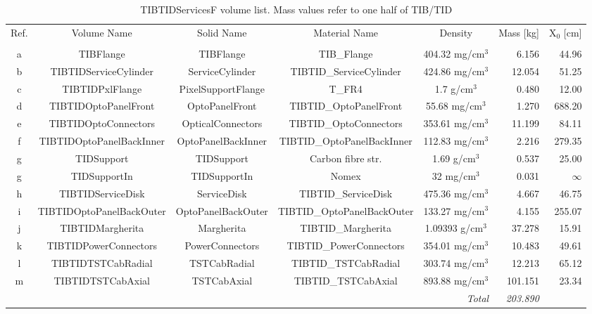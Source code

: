 \begin{table}
  \caption{\textsf {TIBTIDServicesF} volume list. Mass values refer to one half of TIB/TID}
  \label{tab:TIBTIDServicesF}
  \begin{center}
    \begin{tabular}{cccccrr}
      Ref.  & Volume Name  & Solid Name  & Material Name  & Density                  & Mass [kg] & X$_0$ [cm]     \\ 
      \\
 a & TIBFlange             &  TIBFlange        & TIB\_Flange             & 404.32 mg/cm$^3$  &       6.156  &  44.96 \\ 
 b & TIBTIDServiceCylinder & ServiceCylinder   & TIBTID\_ServiceCylinder & 424.86 mg/cm$^3$  &      12.054  &  51.25 \\ 
 c & TIBTIDPxlFlange       & PixelSupportFlange  & T\_FR4                & 1.7 g/cm$^3$      &       0.480  &  12.00 \\ 
 d & TIBTIDOptoPanelFront  & OptoPanelFront    & TIBTID\_OptoPanelFront  & 55.68 mg/cm$^3$   &       1.270  & 688.20 \\ 
 e & TIBTIDOptoConnectors  & OpticalConnectors & TIBTID\_OptoConnectors  & 353.61 mg/cm$^3$  &      11.199  &  84.11 \\ 
 f & TIBTIDOptoPanelBackInner & OptoPanelBackInner & TIBTID\_OptoPanelBackInner & 112.83 mg/cm$^3$ & 2.216  & 279.35 \\ 
 g & TIDSupport            & TIDSupport        & Carbon fibre str.       & 1.69 g/cm$^3$     &       0.537  &  25.00 \\ 
 g & TIDSupportIn          & TIDSupportIn      & Nomex                   & 32 mg/cm$^3$      &       0.031  & $\infty$ \\ 
 h & TIBTIDServiceDisk     & ServiceDisk       & TIBTID\_ServiceDisk     & 475.36 mg/cm$^3$  &       4.667  &  46.75 \\ 
 i & TIBTIDOptoPanelBackOuter & OptoPanelBackOuter & TIBTID\_OptoPanelBackOuter & 133.27 mg/cm$^3$ & 4.155  & 255.07 \\ 
 j & TIBTIDMargherita      & Margherita        & TIBTID\_Margherita      & 1.09393 g/cm$^3$  &      37.278  &  15.91 \\ 
 k & TIBTIDPowerConnectors & PowerConnectors   & TIBTID\_PowerConnectors & 354.01 mg/cm$^3$  &      10.483  & 49.61 \\ 
 l & TIBTIDTSTCabRadial    & TSTCabRadial      & TIBTID\_TSTCabRadial    & 303.74 mg/cm$^3$  &      12.213  &  65.12 \\ 
 m & TIBTIDTSTCabAxial     & TSTCabAxial       & TIBTID\_TSTCabAxial     & 893.88 mg/cm$^3$  &     101.151  &  23.34 \\ 
\multicolumn{5}{r}{\em Total } & {\em 203.890} & \\
    \end{tabular}
  \end{center}
\end{table}
%

